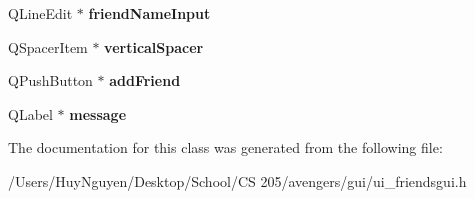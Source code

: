 \begin{DoxyCompactItemize}
\item 
Q\+Line\+Edit $\ast$ {\bfseries friend\+Name\+Input}\hypertarget{classUi__FriendsGUI_a5ba9fe3489ae7fcedd3428b5d935b53d}{}\label{classUi__FriendsGUI_a5ba9fe3489ae7fcedd3428b5d935b53d}

\item 
Q\+Spacer\+Item $\ast$ {\bfseries vertical\+Spacer}\hypertarget{classUi__FriendsGUI_a04c810fce225f7527f0a7fcfc9fc0f70}{}\label{classUi__FriendsGUI_a04c810fce225f7527f0a7fcfc9fc0f70}

\item 
Q\+Push\+Button $\ast$ {\bfseries add\+Friend}\hypertarget{classUi__FriendsGUI_acf4e942b369a8a0d39893d26ebde052d}{}\label{classUi__FriendsGUI_acf4e942b369a8a0d39893d26ebde052d}

\item 
Q\+Label $\ast$ {\bfseries message}\hypertarget{classUi__FriendsGUI_a591e228cccc9890db33319e396ac5818}{}\label{classUi__FriendsGUI_a591e228cccc9890db33319e396ac5818}

\end{DoxyCompactItemize}


The documentation for this class was generated from the following file\+:\begin{DoxyCompactItemize}
\item 
/\+Users/\+Huy\+Nguyen/\+Desktop/\+School/\+C\+S 205/avengers/gui/ui\+\_\+friendsgui.\+h\end{DoxyCompactItemize}
